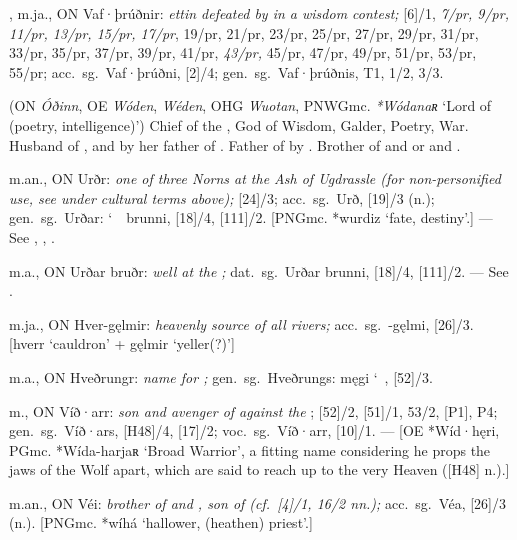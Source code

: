 \begin{itemize}
, m.ja., ON Vaf·þrúðnir:
  \emph{ettin defeated by  in a wisdom contest;} [6]/1, \emph{7/pr, 9/pr, 11/pr, 13/pr, 15/pr, 17/pr}, 19/pr, 21/pr, 23/pr, 25/pr, 27/pr, 29/pr, 31/pr, 33/pr, 35/pr, 37/pr, 39/pr, 41/pr, \emph{43/pr,} 45/pr, 47/pr, 49/pr, 51/pr, 53/pr, 55/pr; acc.~sg.~Vaf·þrúðni, [2]/4; gen.~sg.~Vaf·þrúðnis,  T1, 1/2, 3/3.

 (ON \emph{Óðinn}, OE \emph{Wóden}, \emph{Wéden}, OHG \emph{Wuotan}, PNWGmc. \emph{*Wódanaʀ} ‘Lord of  (poetry, intelligence)’)
  Chief of the , God of Wisdom, Galder, Poetry, War.  Husband of , and by her father of .  Father of  by .  Brother of  and  or  and .

 m.an., ON Urðr:
  \emph{one of three Norns at the Ash of Ugdrassle (for non-personified use, see under cultural terms above);} [24]/3; acc.~sg.~Urð, [19]/3 (n.); gen.~sg.~Urðar: \char`~\ brunni, [18]/4, [111]/2.
  [PNGmc. *wurdiz ‘fate, destiny’.]
  --- See , , .

 m.a., ON Urðar bruðr:
  \emph{well at the ;} dat.~sg.~Urðar brunni, [18]/4, [111]/2.
  --- See .

 m.ja., ON Hver-gęlmir:
  \emph{heavenly source of all rivers;} acc.~sg.~-gęlmi, [26]/3.
  [hverr ‘cauldron’ + gęlmir ‘yeller(?)’]

 m.a., ON Hveðrungr:
  \emph{name for ;} gen.~sg.~Hveðrungs: męgi \char`~, [52]/3.

 m., ON Víð·arr:
  \emph{son and avenger of  against the }; [52]/2, [51]/1, 53/2, [P1], P4; gen.~sg.~Víð·ars, [H48]/4, [17]/2; voc.~sg.~Víð·arr, [10]/1. ---
  [OE *Wíd·hęri, PGmc. *Wída-harjaʀ ‘Broad Warrior’, a fitting name considering he props the jaws of the Wolf apart, which are said to reach up to the very Heaven ([H48] n.).]

 m.an., ON Véi:
  \emph{brother of  and , son of  (cf.~[4]/1, 16/2 nn.);} acc.~sg.~Véa, [26]/3 (n.).
  [PNGmc. *wíhá ‘hallower, (heathen) priest’.]


\end{itemize}

